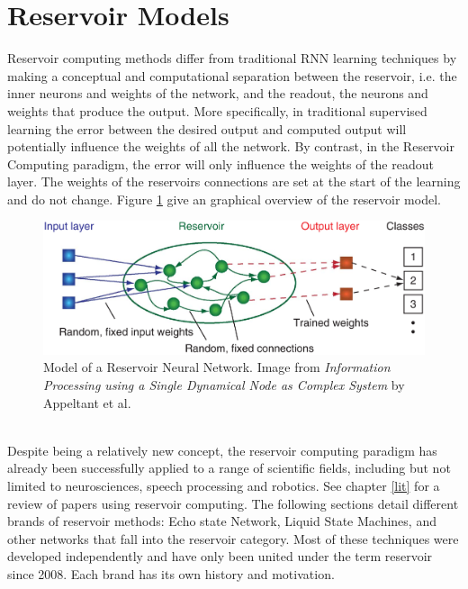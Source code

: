 \documentclass[12pt,oneside]{CUNY_CS_PhD}
\begin{document}
\section{Reservoir Models}
Reservoir computing methods differ from traditional RNN learning techniques by making a conceptual  and computational separation between the reservoir, i.e. the inner neurons and weights of the network, and the readout, the neurons and weights that produce the output. More specifically, in traditional supervised learning the error between the desired output and computed output will potentially influence the weights of all the network. By contrast, in the Reservoir Computing paradigm, the error will only influence the weights of the readout layer. The weights of the reservoirs connections are set at the start of the learning and do not change. Figure \ref{fig:reservoir} give an graphical overview of the reservoir model.
\begin{figure}[!htbp]
\centering
\includegraphics[width=1.0\textwidth]{pictures/reservoir_network.png}
\caption{Model of a Reservoir Neural Network. Image from \textit{Information Processing using a Single Dynamical Node as Complex System} by Appeltant et al. \cite{appeltant2011information} }
\label{fig:reservoir}
\end{figure}\\
Despite being a relatively new concept, the reservoir computing paradigm has already been successfully applied to a range of scientific fields, including but not limited to neurosciences, speech processing and robotics. See chapter \ref{lit} for a review of papers using reservoir computing. The following sections detail different brands of reservoir methods: Echo state Network, Liquid State Machines, and other networks that fall into the reservoir category. Most of these techniques were developed independently and have only been united under the term reservoir since 2008. Each brand has its own history and motivation.

\end{document}
